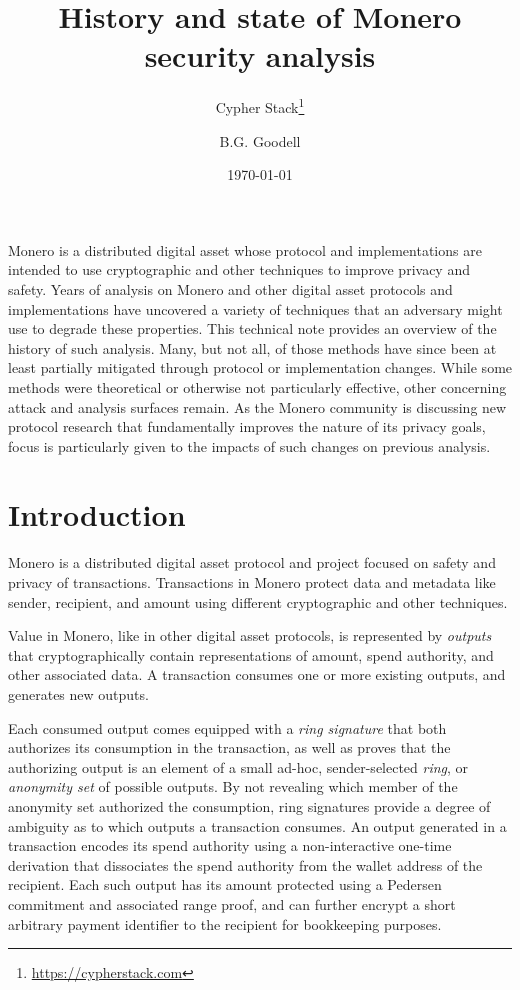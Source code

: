 \documentclass{article}
\title{History and state of Monero security analysis}
\author{Cypher Stack\thanks{\url{https://cypherstack.com}} \and B.G. Goodell}
\date{\today}
\theoremstyle{definition}
\begin{document}
\maketitle

Monero is a distributed digital asset whose protocol and implementations are intended to use cryptographic and other techniques to improve privacy and safety.
Years of analysis on Monero and other digital asset protocols and implementations have uncovered a variety of techniques that an adversary might use to degrade these properties.
This technical note provides an overview of the history of such analysis.
Many, but not all, of those methods have since been at least partially mitigated through protocol or implementation changes.
While some methods were theoretical or otherwise not particularly effective, other concerning attack and analysis surfaces remain.
As the Monero community is discussing new protocol research that fundamentally improves the nature of its privacy goals, focus is particularly given to the impacts of such changes on previous analysis.


\tableofcontents


\section{Introduction}

Monero is a distributed digital asset protocol and project focused on safety and privacy of transactions.
Transactions in Monero protect data and metadata like sender, recipient, and amount using different cryptographic and other techniques.

Value in Monero, like in other digital asset protocols, is represented by \textit{outputs} that cryptographically contain representations of amount, spend authority, and other associated data.
A transaction consumes one or more existing outputs, and generates new outputs.

Each consumed output comes equipped with a \textit{ring signature} that both authorizes its consumption in the transaction, as well as proves that the authorizing output is an element of a small ad-hoc, sender-selected \textit{ring}, or \textit{anonymity set} of possible outputs.
By not revealing which member of the anonymity set authorized the consumption, ring signatures provide a degree of ambiguity as to which outputs a transaction consumes.
An output generated in a transaction encodes its spend authority using a non-interactive one-time derivation that dissociates the spend authority from the wallet address of the recipient.
Each such output has its amount protected using a Pedersen commitment and associated range proof, and can further encrypt a short arbitrary payment identifier to the recipient for bookkeeping purposes.
\end{document}
